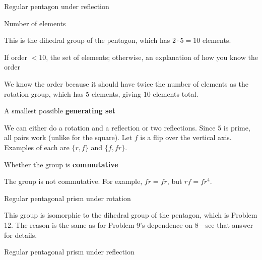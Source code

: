 \documentclass[../key.tex]{subfiles}
\begin{document}
\begin{outer_problem}
\item Regular pentagon under reflection
\end{outer_problem}

\begin{inner_problem}[start=1]
\item Number of elements
\end{inner_problem}

\noindent This is the dihedral group of the pentagon, which has $2\cdot 5=10$ elements.

\begin{inner_problem}
\item If order $< 10$, the set of elements; otherwise, an explanation of how you know the order
\end{inner_problem}

\noindent We know the order because it should have twice the number of elements as the rotation group, which has $5$ elements, giving $10$ elements total.

\begin{inner_problem}
\item A smallest possible \textbf{generating set}
\end{inner_problem}

\noindent We can either do a rotation and a reflection or two reflections. Since $5$ is prime, all pairs work (unlike for the square). Let $f$ is a flip over the vertical axis. Examples of each are $\{r,f\}$ and $\{f,fr\}$.

\begin{inner_problem}
\item Whether the group is \textbf{commutative}
\end{inner_problem}

\noindent The group is not commutative. For example, $fr=fr$, but $rf=fr^4$.

\begin{outer_problem}
\item Regular pentagonal prism under rotation
\end{outer_problem}

\noindent This group is isomorphic to the dihedral group of the pentagon, which is Problem 12. The reason is the same as for Problem 9's dependence on 8---see that answer for details.

\begin{outer_problem}
\item Regular pentagonal prism under reflection
\end{outer_problem}
\end{document}

